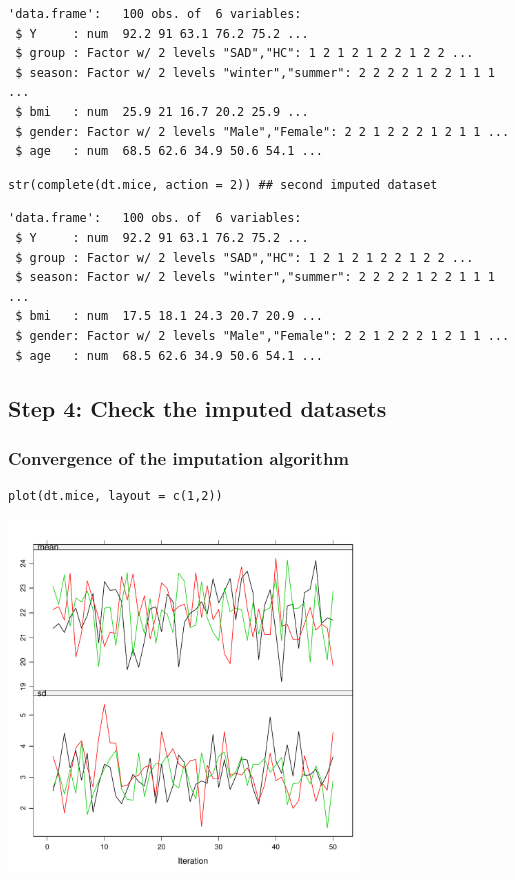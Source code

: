 \documentclass[12pt]{article}
\begin{document}
\begin{verbatim}
'data.frame':	100 obs. of  6 variables:
 $ Y     : num  92.2 91 63.1 76.2 75.2 ...
 $ group : Factor w/ 2 levels "SAD","HC": 1 2 1 2 1 2 2 1 2 2 ...
 $ season: Factor w/ 2 levels "winter","summer": 2 2 2 2 1 2 2 1 1 1 ...
 $ bmi   : num  25.9 21 16.7 20.2 25.9 ...
 $ gender: Factor w/ 2 levels "Male","Female": 2 2 1 2 2 2 1 2 1 1 ...
 $ age   : num  68.5 62.6 34.9 50.6 54.1 ...
\end{verbatim}

\lstset{language=r,label= ,caption= ,captionpos=b,numbers=none}
\begin{lstlisting}
str(complete(dt.mice, action = 2)) ## second imputed dataset
\end{lstlisting}

\begin{verbatim}
'data.frame':	100 obs. of  6 variables:
 $ Y     : num  92.2 91 63.1 76.2 75.2 ...
 $ group : Factor w/ 2 levels "SAD","HC": 1 2 1 2 1 2 2 1 2 2 ...
 $ season: Factor w/ 2 levels "winter","summer": 2 2 2 2 1 2 2 1 1 1 ...
 $ bmi   : num  17.5 18.1 24.3 20.7 20.9 ...
 $ gender: Factor w/ 2 levels "Male","Female": 2 2 1 2 2 2 1 2 1 1 ...
 $ age   : num  68.5 62.6 34.9 50.6 54.1 ...
\end{verbatim}

\clearpage

\subsection{Step 4: Check the imputed datasets}
\label{sec:orgbdb2fb4}
\subsubsection{Convergence of the imputation algorithm}
\label{sec:org5076bca}

\lstset{language=r,label= ,caption= ,captionpos=b,numbers=none}
\begin{lstlisting}
plot(dt.mice, layout = c(1,2))
\end{lstlisting}

\begin{center}
\includegraphics[width=0.70\textwidth]{./figures/traceCVimputed.pdf}
\end{center}
\end{document}
